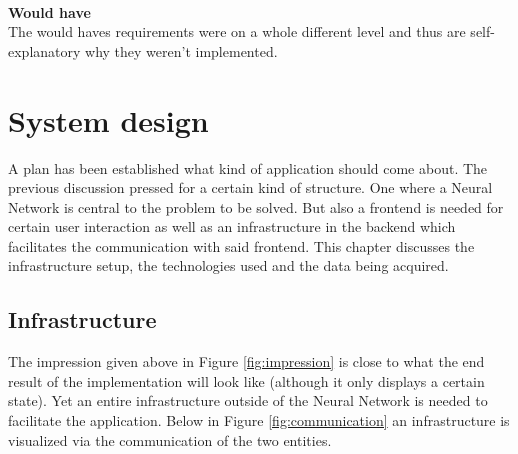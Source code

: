 \documentclass[a4paper,onecolumn]{report}
\begin{document}
\\
\textbf{Would have}\\
The would haves requirements were on a whole different level and thus are self-explanatory why they weren't implemented.

\chapter{System design}
\label{chap:softwarearchitecture}
A plan has been established what kind of application should come about. The previous discussion pressed for a certain kind of structure. One where a Neural Network is central to the problem to be solved. But also a frontend is needed for certain user interaction as well as an infrastructure in the backend which facilitates the communication with said frontend. This chapter discusses the infrastructure setup, the technologies used and the data being acquired.

\section{Infrastructure}
The impression given above in Figure \ref{fig:impression} is close to what the end result of the implementation will look like (although it only displays a certain state). Yet an entire infrastructure outside of the Neural Network is needed to facilitate the application. Below in Figure \ref{fig:communication} an infrastructure is visualized via the communication of the two entities.
\end{document}
